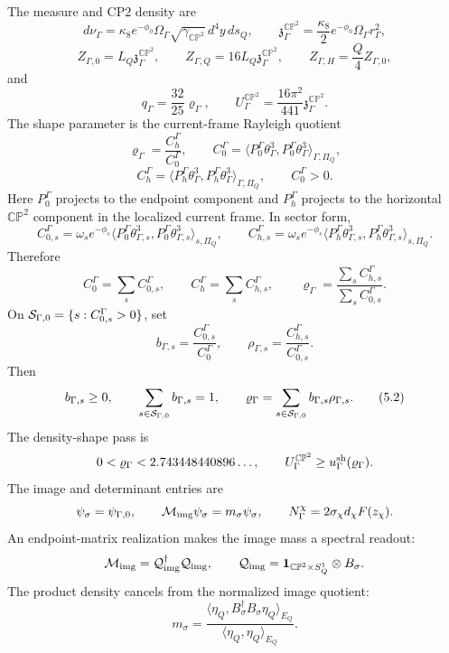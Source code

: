 \documentclass[11pt]{article}
\theoremstyle{definition}
\theoremstyle{remark}
\newcommand{\CP}{\mathbb{CP}}
\begin{document}
The measure and CP2 density are
\[
  d\nu_\Gamma
  =
  \kappa_8e^{-\phi_0}\Omega_\Gamma
  \sqrt{\gamma_{\CP^2}}\,d^4y\,ds_Q,
  \qquad
  {\mathfrak z}_{\Gamma}^{\CP^2}
  =
  \frac{\kappa_8}{2}e^{-\phi_0}\Omega_\Gamma r_\Gamma^2 ,
\]
\[
  Z_{\Gamma,0}=L_Q{\mathfrak z}_{\Gamma}^{\CP^2},
  \qquad
  Z_{\Gamma,Q}=16L_Q{\mathfrak z}_{\Gamma}^{\CP^2},
  \qquad
  Z_{\Gamma,H}=\frac Q4Z_{\Gamma,0},
\]
and
\[
  q_\Gamma=\frac{32}{25}\varrho_\Gamma,
  \qquad
  U_\Gamma^{\CP^2}
  =
  \frac{16\pi^2}{441}{\mathfrak z}_{\Gamma}^{\CP^2}.
\]
The shape parameter is the current-frame Rayleigh quotient
\[
  \varrho_\Gamma
  =
  \frac{C_h^\Gamma}{C_0^\Gamma},
  \qquad
  C_0^\Gamma
  =
  \langle P_0^\Gamma\theta_\Gamma^3,
  P_0^\Gamma\theta_\Gamma^3\rangle_{\Gamma,\Pi_Q},
\]
\[
  C_h^\Gamma
  =
  \langle P_h^\Gamma\theta_\Gamma^3,
  P_h^\Gamma\theta_\Gamma^3\rangle_{\Gamma,\Pi_Q},
  \qquad
  C_0^\Gamma>0 .
\]
Here \(P_0^\Gamma\) projects to the endpoint component and \(P_h^\Gamma\)
projects to the horizontal \(\CP^2\) component in the localized current
frame.
In sector form,
\[
  C_{0,s}^\Gamma
  =
  \omega_s e^{-\phi_s}
  \langle P_0^\Gamma\theta_{\Gamma,s}^3,
  P_0^\Gamma\theta_{\Gamma,s}^3\rangle_{s,\Pi_Q},
  \qquad
  C_{h,s}^\Gamma
  =
  \omega_s e^{-\phi_s}
  \langle P_h^\Gamma\theta_{\Gamma,s}^3,
  P_h^\Gamma\theta_{\Gamma,s}^3\rangle_{s,\Pi_Q}.
\]
Therefore
\[
  C_0^\Gamma=\sum_sC_{0,s}^\Gamma,
  \qquad
  C_h^\Gamma=\sum_sC_{h,s}^\Gamma,
  \qquad
  \varrho_\Gamma
  =
  \frac{\sum_sC_{h,s}^\Gamma}{\sum_sC_{0,s}^\Gamma}.
  \tag{5.1}
\]
On \({\cal S}_{\Gamma,0}=\{s:C_{0,s}^\Gamma>0\}\), set
\[
  b_{\Gamma,s}=\frac{C_{0,s}^\Gamma}{C_0^\Gamma},
  \qquad
  \rho_{\Gamma,s}=\frac{C_{h,s}^\Gamma}{C_{0,s}^\Gamma}.
\]
Then
\[
  b_{\Gamma,s}\ge0,\qquad
  \sum_{s\in{\cal S}_{\Gamma,0}}b_{\Gamma,s}=1,
  \qquad
  \varrho_\Gamma
  =
  \sum_{s\in{\cal S}_{\Gamma,0}}b_{\Gamma,s}\rho_{\Gamma,s}.
  \tag{5.2}
\]
The density-shape pass is
\[
  0<\varrho_\Gamma<2.743448440896\ldots,
  \qquad
  U_\Gamma^{\CP^2}\ge u_\Gamma^{\rm sh}(\varrho_\Gamma).
\]
The image and determinant entries are
\[
  \psi_\sigma=\psi_{\Gamma,0},
  \qquad
  {\cal M}_{\rm img}\psi_\sigma=m_\sigma\psi_\sigma,
  \qquad
  N_\Gamma^\chi=2\sigma_\chi d_\chi F(z_\chi).
\]
An endpoint-matrix realization makes the image mass a spectral readout:
\[
  {\cal M}_{\rm img}
  =
  {\cal Q}_{\rm img}^\dagger{\cal Q}_{\rm img},
  \qquad
  {\cal Q}_{\rm img}
  =
  {\bf 1}_{\CP^2\times S^1_Q}\otimes B_\sigma .
\]
The product density cancels from the normalized image quotient:
\[
  m_\sigma
  =
  \frac{
  \langle\eta_Q,B_\sigma^\dagger B_\sigma\eta_Q\rangle_{E_Q}}
  {\langle\eta_Q,\eta_Q\rangle_{E_Q}} .
\]
\end{document}

